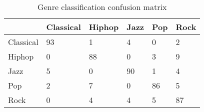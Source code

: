 \begin{table}[h!]
        \caption{Genre classification confusion matrix}
        \begin{center}
                \begin{tabular}{|l|l|l|l|l|l|}
                        \hline
                        &
                        Classical
                        &
                        Hiphop
                        &
                        Jazz
                        &
                        Pop
                        &
                        Rock
                        \\\hline

                        Classical
                        &
                        93
                        &
                        1
                        &
                        4
                        &
                        0
                        &
                        2
                        \\\hline

                        Hiphop
                        &
                        0
                        &
                        88
                        &
                        0
                        &
                        3
                        &
                        9
                        \\\hline


                        Jazz
                        &
                        5
                        &
                        0
                        &
                        90
                        &
                        1
                        &
                        4
                        \\\hline


                        Pop
                        &
                        2
                        &
                        7
                        &
                        0
                        &
                        86
                        &
                        5
                        \\\hline

                        Rock
                        &
                        0
                        &
                        4
                        &
                        4
                        &
                        5
                        &
                        87
                        \\\hline
                \end{tabular}
        \end{center}
\end{table}

